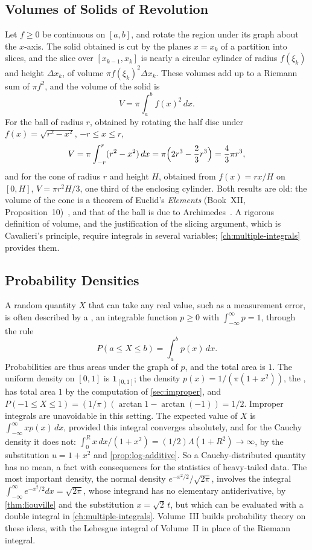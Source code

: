 \subsection{Volumes of Solids of Revolution}

Let $f\ge0$ be continuous on $[a,b]$, and rotate the region under its graph about the $x$-axis. The solid obtained is cut by the planes $x=x_k$ of a partition into slices, and the slice over $[x_{k-1},x_k]$ is nearly a circular cylinder of radius $f(\xi_k)$ and height $\Delta x_k$, of volume $\pi f(\xi_k)^2\Delta x_k$. These volumes add up to a Riemann sum of $\pi f^2$, and the volume of the solid is
\[
V=\pi\int_a^bf(x)^2\,dx .
\]
For the ball of radius $r$, obtained by rotating the half disc under $f(x)=\sqrt{r^2-x^2}$, $-r\le x\le r$,
\[
V=\pi\int_{-r}^r(r^2-x^2)\,dx=\pi\Bigl(2r^3-\frac23r^3\Bigr)=\frac43\pi r^3 ,
\]
and for the cone of radius $r$ and height $H$, obtained from $f(x)=rx/H$ on $[0,H]$, $V=\pi r^2H/3$, one third of the enclosing cylinder. Both results are old: the volume of the cone is a theorem of Euclid's \emph{Elements} (Book~XII, Proposition~10)~\cite{heath1956euclid}, and that of the ball is due to Archimedes~\cite{heath1897archimedes}. A rigorous definition of volume, and the justification of the slicing argument, which is Cavalieri's principle, require integrals in several variables; \cref{ch:multiple-integrals} provides them.

\subsection{Probability Densities}

A random quantity $X$ that can take any real value, such as a measurement error, is often described by a , an integrable function $p\ge0$ with $\int_{-\infty}^\infty p=1$, through the rule
\[
P(a\le X\le b)=\int_a^bp(x)\,dx .
\]
Probabilities are thus areas under the graph of $p$, and the total area is $1$. The uniform density on $[0,1]$ is $\mathbf 1_{[0,1]}$; the density $p(x)=1/(\pi(1+x^2))$, the , has total area $1$ by the computation of \cref{sec:improper}, and $P(-1\le X\le1)=(1/\pi)(\arctan1-\arctan(-1))=1/2$. Improper integrals are unavoidable in this setting. The expected value of $X$ is $\int_{-\infty}^\infty xp(x)\,dx$, provided this integral converges absolutely, and for the Cauchy density it does not: $\int_0^Rx\,dx/(1+x^2)=(1/2)\Lambda(1+R^2)\to\infty$, by the substitution $u=1+x^2$ and \cref{prop:log-additive}. So a Cauchy-distributed quantity has no mean, a fact with consequences for the statistics of heavy-tailed data. The most important density, the normal density $e^{-x^2/2}/\sqrt{2\pi}$, involves the integral $\int_{-\infty}^\infty e^{-x^2/2}dx=\sqrt{2\pi}$, whose integrand has no elementary antiderivative, by \cref{thm:liouville} and the substitution $x=\sqrt2\,t$, but which can be evaluated with a double integral in \cref{ch:multiple-integrals}. Volume~III builds probability theory on these ideas, with the Lebesgue integral of Volume~II in place of the Riemann integral.

